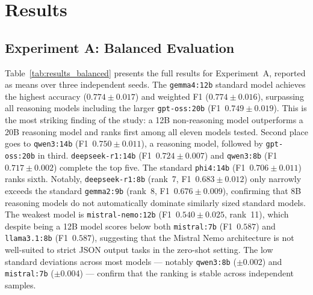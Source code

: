 \documentclass[journal]{IEEEtran}
\begin{document}
\section{Results}
\label{sec:results}

\subsection{Experiment A: Balanced Evaluation}

Table~\ref{tab:results_balanced} presents the full results for
Experiment~A, reported as means over three independent seeds.
The \texttt{gemma4:12b} standard model achieves the
highest accuracy ($0.774 \pm 0.017$) and weighted F1 ($0.774 \pm 0.016$),
surpassing all reasoning models including the larger
\texttt{gpt-oss:20b} (F1~$0.749 \pm 0.019$). This is the most striking
finding of the study: a 12B non-reasoning model outperforms a 20B
reasoning model and ranks first among all eleven models tested.
Second place goes to \texttt{qwen3:14b} (F1~$0.750 \pm 0.011$),
a reasoning model, followed by \texttt{gpt-oss:20b} in third.
\texttt{deepseek-r1:14b} (F1~$0.724 \pm 0.007$) and
\texttt{qwen3:8b} (F1~$0.717 \pm 0.002$) complete the top five.
The standard \texttt{phi4:14b} (F1~$0.706 \pm 0.011$) ranks sixth.
Notably, \texttt{deepseek-r1:8b} (rank~7, F1~$0.683 \pm 0.012$)
only narrowly exceeds the standard \texttt{gemma2:9b} (rank~8,
F1~$0.676 \pm 0.009$), confirming that 8B reasoning models do not
automatically dominate similarly sized standard models. The weakest model is \texttt{mistral-nemo:12b}
(F1~$0.540 \pm 0.025$, rank~11), which despite being a 12B model
scores below both \texttt{mistral:7b} (F1~$0.587$) and
\texttt{llama3.1:8b} (F1~$0.587$), suggesting that the Mistral Nemo
architecture is not well-suited to strict JSON output tasks in the zero-shot
setting. The low standard deviations across most models —
notably \texttt{qwen3:8b} ($\pm$0.002) and \texttt{mistral:7b}
($\pm$0.004) — confirm that the ranking is stable across independent
samples.
\end{document}
